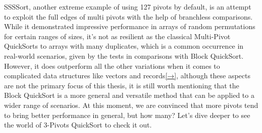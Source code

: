 \documentclass[a4paper,oneside,12pt]{book}
\begin{document}
SSSSort, another extreme example of using 127 pivots by default, is an attempt to exploit the full edges of multi pivots with the help of branchless comparisons. While it demonstrated impressive performance in arrays of random permutations for certain ranges of sizes,
it's not as resilient as the classical Multi-Pivot QuickSorts to arrays with many duplicates, which is a common occurrence in real-world scenarios, given by the tests in comparisons with Block QuickSort\cite{BlockQuickSort}. However, it does outperform all the other variations when it comes to complicated
data structures like vectors and records\hyperlink{ref:record}{[→]}, although these aspects are not the primary focus of this thesis, it is still worth mentioning that the Block QuickSort is a more general and versatile method that can be applied to a wider range of scenarios. At this moment, we are convinced that more pivots tend to bring better performance in general, but how many?
Let's dive deeper to see the world of 3-Pivots QuickSort to check it out.
\end{document}
